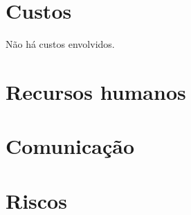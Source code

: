 \documentclass[
  12pt,
  openright,
  twoside,
  a4paper,
  english,
  brazil
]{abntex2}
\begin{document}
\chapter{Custos}\label{cap:custos}

Não há custos envolvidos.

\chapter{Recursos humanos}\label{cap:recursos_humanos}

\chapter{Comunicação}\label{cap:comunicacao}

\chapter{Riscos}\label{cap:riscos}

\postextual{}


\end{document}
